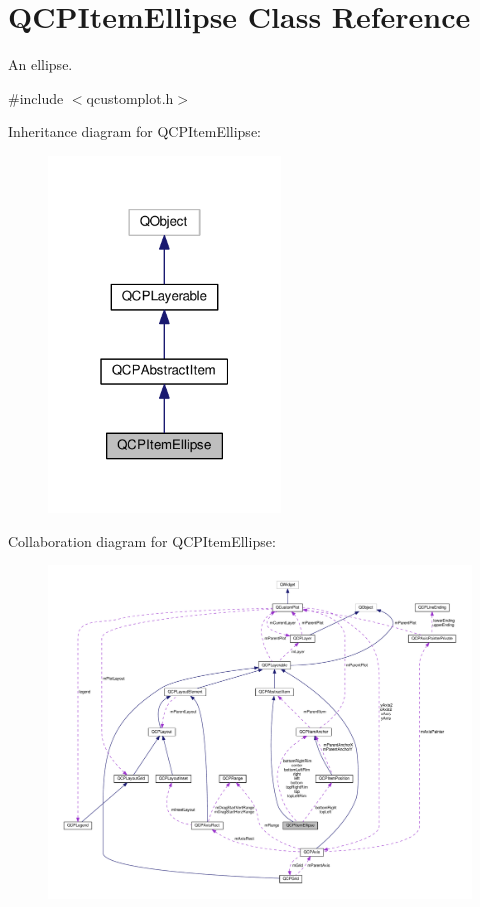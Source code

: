 \hypertarget{classQCPItemEllipse}{}\section{Q\+C\+P\+Item\+Ellipse Class Reference}
\label{classQCPItemEllipse}


An ellipse.  




{\ttfamily \#include $<$qcustomplot.\+h$>$}



Inheritance diagram for Q\+C\+P\+Item\+Ellipse\+:
\nopagebreak
\begin{figure}[H]
\begin{center}
\leavevmode
\includegraphics[width=175pt]{classQCPItemEllipse__inherit__graph}
\end{center}
\end{figure}


Collaboration diagram for Q\+C\+P\+Item\+Ellipse\+:
\nopagebreak
\begin{figure}[H]
\begin{center}
\leavevmode
\includegraphics[width=350pt]{classQCPItemEllipse__coll__graph}
\end{center}
\end{figure}
